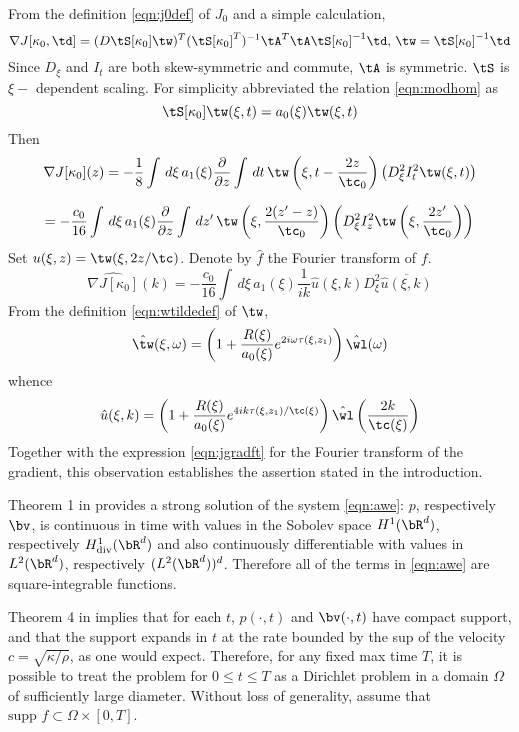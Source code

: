 

From the definition \ref{eqn:j0def} of $J_0$ and a simple calculation,
\[
\nabla J[\kappa_0,\td] = (D\tS[\kappa_0]\tw)^T(\tS[\kappa_0]^T)^{-1}\tA^T\tA
\tS[\kappa_0]^{-1}\td,  \,\tw=\tS[\kappa_0]^{-1}\td
\]
Since $D_{\xi}$ and $I_t$ are both skew-symmetric and commute, $\tA$
is symmetric. $\tS$ is $\xi-$ dependent scaling. For simplicity
abbreviated the relation \ref{eqn:modhom} as
\[
\tS[\kappa_0]\tw(\xi,t) = a_0(\xi)\tw(\xi,t)
\]
Then
\[
\nabla J[\kappa_0](z) =
- 
\frac{1}{8} \int \,d\xi\,a_1(\xi)\frac{\partial}{\partial z} \int \,dt\, 
  \tw\left(\xi,t-\frac{2z}{\tc_0}\right)\left(D_{\xi}^2I_t^2 \tw(\xi,t)\right)
\]

\begin{equation}
\label{eqn:jgrad}
=-\frac{c_0}{16} \int \,d\xi\,a_1(\xi)\frac{\partial}{\partial z} \int \,dz'\, 
  \tw\left(\xi,\frac{2(z'-z)}{\tc_0}\right)\left(D_{\xi}^2I_z^2
    \tw\left(\xi,\frac{2z'}{\tc_0}\right)\right)
\end{equation} 
Set $u(\xi,z) = \tw(\xi,2z/\tc)$. Denote by $\hat{f}$ the Fourier
transform of $f$.  
\begin{equation}
\label{eqn:jgradft}
\widehat{\nabla J[\kappa_0]}(k) = -\frac{c_0}{16}\int\, d\xi\,a_1(\xi) 
\frac{1}{ik}\hat{u}(\xi,k)D_{\xi}^2\overline{\hat{u}(\xi,k)}
\end{equation}
From the definition \ref{eqn:wtildedef} of $\tw$,
\[
\hat{\tw}(\xi,\omega) = \left(1 + \frac{R(\xi)}{a_0(\xi)}e^{2i\omega\tau(\xi,z_1)}\right)\hat{\wl}(\omega)
\]
whence
\[
\hat{u}(\xi,k) = \left(1 +
  \frac{R(\xi)}{a_0(\xi)}e^{4ik\tau(\xi,z_1)/\tc(\xi)}\right)\hat{\wl}\left(\frac{2k}{\tc(\xi)}\right) 
\]
Together with the expression \ref{eqn:jgradft} for the Fourier
transform of the gradient, this observation establishes the assertion
stated in the introduction.

Theorem 1 in \cite[]{BlazekStolkSymes:13} provides a strong solution of the system \ref{eqn:awe}: $p$, respectively $\bv$, is continuous
in time with values in the Sobolev space $H^1(\bR^d)$, respectively
$H^1_{\rm div}(\bR^d)$ and
also continuously differentiable with values in $L^2(\bR^d)$,
respectively $(L^2(\bR^d))^d$. Therefore all of the terms in
\ref{eqn:awe} are square-integrable functions.

Theorem 4 in \cite[]{BlazekStolkSymes:13} implies that for each $t$, $p(\cdot,t)$ and $\bv(\cdot,t)$
have compact support, and that the support expands in $t$ at the rate
bounded by the sup of the velocity $c=\sqrt{\kappa/\rho}$, as one
would expect. Therefore, for any fixed max time $T$, it is possible to
treat the problem for $0\le t \le T$ as a Dirichlet problem in a
domain $\Omega$ of sufficiently large diameter. Without loss of
generality, assume that $\mbox{supp }f \subset \Omega \times [0,T]$.

